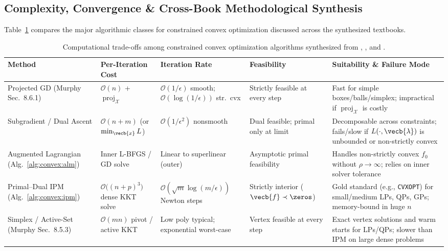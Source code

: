 \documentclass[../../../../master.tex]{subfiles}
\begin{document}
\subsection{Complexity, Convergence \& Cross-Book Methodological Synthesis}

Table~\ref{tab:convex:solvers} compares the major algorithmic classes for constrained convex optimization discussed across the synthesized textbooks.

\begin{table}[htbp]
\centering
\footnotesize
\setlength{\tabcolsep}{3.5pt}
\renewcommand{\arraystretch}{1.23}
\begin{tabularx}{\textwidth}{@{} >{\raggedright\arraybackslash}p{2.65cm} >{\raggedright\arraybackslash}p{2.6cm} >{\raggedright\arraybackslash}p{2.35cm} >{\raggedright\arraybackslash}p{2.6cm} >{\raggedright\arraybackslash}X @{}}
\toprule
\textbf{Method} & \textbf{Per-Iteration Cost} & \textbf{Iteration Rate} & \textbf{Feasibility} & \textbf{Suitability \& Failure Mode} \\
\midrule
Projected GD (Murphy Sec.\ 8.6.1) & $\mathcal{O}(n)$ + $\operatorname{proj}_{\mathcal{X}}$ & $\mathcal{O}(1/\epsilon)$ smooth; $\mathcal{O}(\log(1/\epsilon))$ str.\ cvx & Strictly feasible at every step & Fast for simple boxes/balls/simplex; impractical if $\operatorname{proj}_{\mathcal{X}}$ is costly \\
Subgradient / Dual Ascent & $\mathcal{O}(n + m)$ (or $\min_{\vecb{x}} L$) & $\mathcal{O}(1/\epsilon^2)$ nonsmooth & Dual feasible; primal only at limit & Decomposable across constraints; fails/slow if $L(\cdot,\vecb{\lambda})$ is unbounded or non-strictly convex \\
Augmented Lagrangian (Alg.~\ref{alg:convex:alm}) & Inner L-BFGS / GD solve & Linear to superlinear (outer) & Asymptotic primal feasibility & Handles non-strictly convex $f_0$ without $\rho \to \infty$; relies on inner solver tolerance \\
Primal--Dual IPM (Alg.~\ref{alg:convex:ipm}) & $\mathcal{O}\bigl((n+p)^3\bigr)$ dense KKT solve & $\mathcal{O}(\sqrt{m}\log(m/\epsilon))$ Newton steps & Strictly interior ($\vecb{f} \prec \zeros$) & Gold standard (e.g., \texttt{CVXOPT}) for small/medium LPs, QPs, GPs; memory-bound in huge $n$ \\
Simplex / Active-Set (Murphy Sec.\ 8.5.3) & $\mathcal{O}(mn)$ pivot / active KKT & Low poly typical; exponential worst-case & Vertex feasible at every step & Exact vertex solutions and warm starts for LPs/QPs; slower than IPM on large dense problems \\
\bottomrule
\end{tabularx}
\captionsetup{justification=raggedright,singlelinecheck=false}
\caption{Computational trade-offs among constrained convex optimization algorithms synthesized from , , and .}
\label{tab:convex:solvers}
\end{table}
\end{document}
